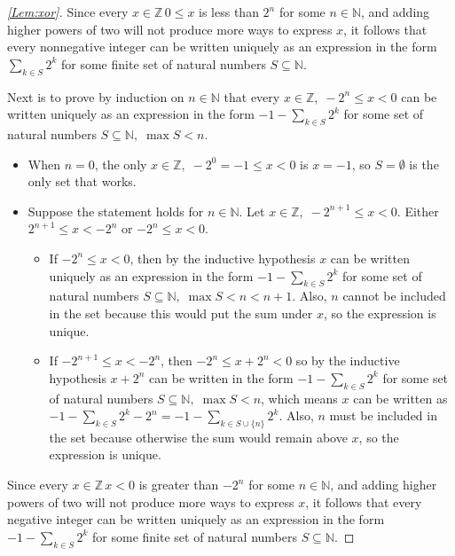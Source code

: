 \documentclass[1gpt]{article}
\makeatletter
\theoremstyle{break}
\theoremstyle{nonumberbreak}
\newtheorem{proof}{Proof}
\newenvironment{Prf}[1]{\begin{proof}[\ref{Lem:#1}]\makeatletter\def\@currentlabel{proof}\makeatother\label{Prf:#1}}{\end{proof}}
\newcommand{\NN}{\mathbb{N}}
\newcommand{\ZZ}{\mathbb{Z}}
\makeatother
\begin{document}
\begin{Prf}{xor}
    Since every $x \in \ZZ\, 0 \leq x$ is less than $2^n$ for some $n \in \NN$, and adding higher powers of two will not produce more ways to express $x$, it follows that every nonnegative integer can be written uniquely as an expression in the form $\sum_{k \in S} 2^k$ for some finite set of natural numbers $S \subseteq \NN$.

    Next is to prove by induction on $n \in \NN$ that every $x \in \ZZ,\; -2^n \leq x < 0$ can be written uniquely as an expression in the form $-1 - \sum_{k \in S} 2^k$ for some set of natural numbers $S \subseteq \NN,\; \max S < n$.

    \begin{itemize}

        \item
            When $n = 0$, the only $x \in \ZZ,\; -2^0 = -1 \leq x < 0$ is $x = -1$, so $S = \emptyset$ is the only set that works.

        \item
            Suppose the statement holds for $n \in \NN$. Let $x \in \ZZ,\; -2^{n+1} \leq x < 0$. Either $2^{n+1} \leq x < -2^n$ or $-2^n \leq x < 0$.

            \begin{itemize}

                \item
                    If $-2^n \leq x < 0$, then by the inductive hypothesis $x$ can be written uniquely as an expression in the form $-1 - \sum_{k \in S} 2^k$ for some set of natural numbers $S \subseteq \NN,\; \max S < n < n + 1$. Also, $n$ cannot be included in the set because this would put the sum under $x$, so the expression is unique.

                \item
                    If $-2^{n+1} \leq x < -2^n$, then $-2^n \leq x+2^n < 0$ so by the inductive hypothesis $x+2^n$ can be written in the form $-1 - \sum_{k \in S} 2^k$ for some set of natural numbers $S \subseteq \NN,\; \max S < n$, which means $x$ can be written as $-1 - \sum_{k \in S} 2^k - 2^n = -1 - \sum_{k \in S \cup \{n\}} 2^k$. Also, $n$ must be included in the set because otherwise the sum would remain above $x$, so the expression is unique.

            \end{itemize}

    \end{itemize}

    Since every $x \in \ZZ\, x < 0$ is greater than $-2^n$ for some $n \in \NN$, and adding higher powers of two will not produce more ways to express $x$, it follows that every negative integer can be written uniquely as an expression in the form $-1 - \sum_{k \in S} 2^k$ for some finite set of natural numbers $S \subseteq \NN$.


\end{Prf}
\end{document}
